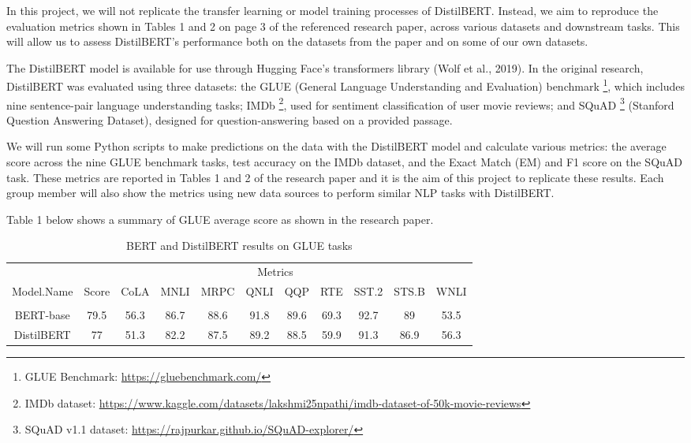\documentclass[
  11pt,
]{article}
\begin{document}
In this project, we will not replicate the transfer learning or model
training processes of DistilBERT. Instead, we aim to reproduce the
evaluation metrics shown in Tables 1 and 2 on page 3 of the referenced
research paper, across various datasets and downstream tasks. This will
allow us to assess DistilBERT's performance both on the datasets from
the paper and on some of our own datasets.

The DistilBERT model is available for use through Hugging Face's
transformers library (Wolf et al., 2019). In the original research,
DistilBERT was evaluated using three datasets: the GLUE (General
Language Understanding and Evaluation) benchmark \footnote{GLUE
  Benchmark: \url{https://gluebenchmark.com/}}, which includes nine
sentence-pair language understanding tasks; IMDb \footnote{IMDb dataset:
  \url{https://www.kaggle.com/datasets/lakshmi25npathi/imdb-dataset-of-50k-movie-reviews}},
used for sentiment classification of user movie reviews; and SQuAD
\footnote{SQuAD v1.1 dataset:
  \url{https://rajpurkar.github.io/SQuAD-explorer/}} (Stanford Question
Answering Dataset), designed for question-answering based on a provided
passage.

We will run some Python scripts to make predictions on the data with the
DistilBERT model and calculate various metrics: the average score across
the nine GLUE benchmark tasks, test accuracy on the IMDb dataset, and
the Exact Match (EM) and F1 score on the SQuAD task. These metrics are
reported in Tables 1 and 2 of the research paper and it is the aim of
this project to replicate these results. Each group member will also
show the metrics using new data sources to perform similar NLP tasks
with DistilBERT.

Table 1 below shows a summary of GLUE average score as shown in the
research paper.

\begin{longtable}[t]{ccccccccccc}
\caption{\label{tab:table1}BERT and DistilBERT results on GLUE tasks}\\
\toprule
\multicolumn{1}{c}{ } & \multicolumn{10}{c}{Metrics} \\
\cmidrule(l{3pt}r{3pt}){2-11}
Model.Name & Score & CoLA & MNLI & MRPC & QNLI & QQP & RTE & SST.2 & STS.B & WNLI\\
\midrule
 &  &  &  &  &  &  &  &  &  & \\
BERT-base & 79.5 & 56.3 & 86.7 & 88.6 & 91.8 & 89.6 & 69.3 & 92.7 & 89 & 53.5\\
DistilBERT & 77 & 51.3 & 82.2 & 87.5 & 89.2 & 88.5 & 59.9 & 91.3 & 86.9 & 56.3\\
\bottomrule
\end{longtable}
\end{document}
